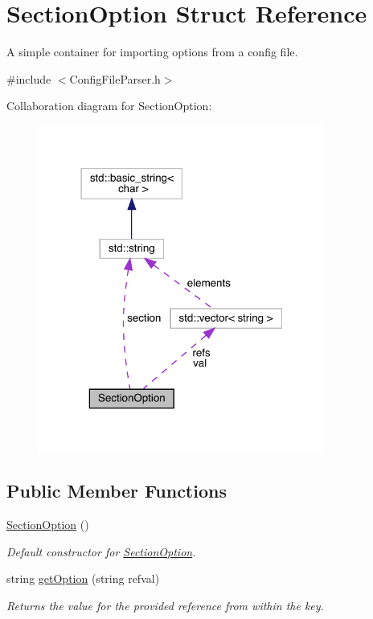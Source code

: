 \hypertarget{struct_section_option}{}\section{Section\+Option Struct Reference}
\label{struct_section_option}


A simple container for importing options from a config file.  




{\ttfamily \#include $<$Config\+File\+Parser.\+h$>$}



Collaboration diagram for Section\+Option\+:
\nopagebreak
\begin{figure}[H]
\begin{center}
\leavevmode
\includegraphics[width=267pt]{struct_section_option__coll__graph}
\end{center}
\end{figure}
\subsection*{Public Member Functions}
\begin{DoxyCompactItemize}
\item 
\hyperlink{struct_section_option_a0a6a33e41311ea0eef34b76379421362}{Section\+Option} ()\hypertarget{struct_section_option_a0a6a33e41311ea0eef34b76379421362}{}\label{struct_section_option_a0a6a33e41311ea0eef34b76379421362}

\begin{DoxyCompactList}\small\item\em Default constructor for \hyperlink{struct_section_option}{Section\+Option}. \end{DoxyCompactList}\item 
string \hyperlink{struct_section_option_a78d55aa842ba2056764236246492734f}{get\+Option} (string refval)
\begin{DoxyCompactList}\small\item\em Returns the value for the provided reference from within the key. \end{DoxyCompactList}\end{DoxyCompactItemize}
